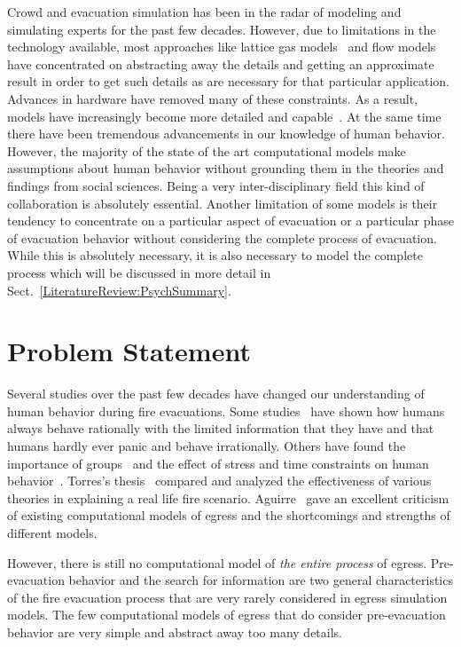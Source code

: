 Crowd and evacuation simulation has been in the radar of modeling and simulating experts for the past few decades. However, due to limitations in the technology available, most approaches like lattice gas models~\cite{Takima:2002wr} and flow models~\cite{Henderson:1974ve} have concentrated on abstracting away the details and getting an approximate result in order to get such details as are necessary for that particular application. Advances in hardware have removed many of these constraints. As a result, models have increasingly become more detailed and capable~\cite{Pan:2006vp}. At the same time there have been tremendous advancements in our knowledge of human behavior. However, the majority of the state of the art computational models make assumptions about human behavior without grounding them in the theories and findings from social sciences. Being a very inter-disciplinary field this kind of collaboration is absolutely essential. Another limitation of some models is their tendency to concentrate on a particular aspect of evacuation or a particular phase of evacuation behavior without considering the complete process of evacuation. While this is absolutely necessary, it is also necessary to model the complete process which will be discussed in more detail in Sect.~\ref{LiteratureReview:PsychSummary}.

\section{Problem Statement}
\label{Intro:ProblemStatement}

Several studies over the past few decades have changed our understanding of human behavior during fire evacuations. Some studies~\cite{Kobes:2009jx,Schadschneider:2008cz,Reicher:2008ep,Torres:2010tj,Paulsen:1984ti,Sime:1983uy} have shown how humans always behave rationally with the limited information that they have and that humans hardly ever panic and behave irrationally. Others have found the importance of groups~\cite{Drury:2009ga} and the effect of stress and time constraints on human behavior~\cite{Ozel:2001tn}. Torres's thesis~\cite{Torres:2010tj} compared and analyzed the effectiveness of various theories in explaining a real life fire scenario. Aguirre~\cite{Aguirre:2004tn} gave an excellent criticism of existing computational models of egress and the shortcomings and strengths of different models.

However, there is still no computational model of \emph{the entire process} of egress. Pre-evacuation behavior and the search for information are two general characteristics of the fire evacuation process that are very rarely considered in egress simulation models. The few computational models of egress that do consider pre-evacuation~\cite{Pires:2005gs,Klupfel:2003wa} behavior are very simple and abstract away too many details.

